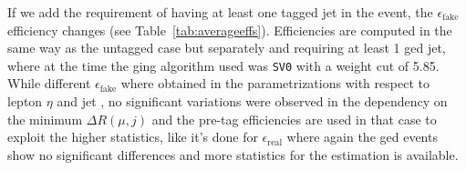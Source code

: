 If we add the requirement of having at least one tagged jet in 
the event, the $\epsilon_\mathrm{fake}$ efficiency changes (see Table~\ref{tab:averageeffs}). 
Efficiencies are computed in the same way as the untagged case 
but separately and requiring at least 1 \btag ged jet, where at the
time the \btag ging algorithm used was \texttt{SV0} with a weight cut 
of 5.85. While different $\epsilon_\mathrm{fake}$ where obtained in the
parametrizations with respect to lepton $\eta$ and jet \pt, 
no significant variations were observed in the dependency on
the minimum $\Delta R(\mu,j)$ and the pre-tag efficiencies are 
used in that case to exploit the higher statistics, like it's done for 
$\epsilon_\mathrm{real}$ where again the \btag ged events show 
no significant differences and more statistics 
for the estimation is available.

